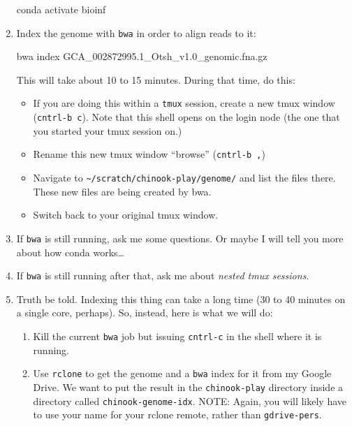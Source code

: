 \documentclass[]{krantz}
\makeatletter
\newenvironment{Shaded}{\begin{snugshade}}{\end{snugshade}}
\newcommand{\ExtensionTok}[1]{#1}
\newcommand{\NormalTok}[1]{#1}
\providecommand{\tightlist}{%
  \setlength{\itemsep}{0pt}\setlength{\parskip}{0pt}}
\newenvironment{kframe}{%
\medskip{}
\setlength{\fboxsep}{.8em}
 \def\at@end@of@kframe{}%
 \ifinner\ifhmode%
  \def\at@end@of@kframe{\end{minipage}}%
  \begin{minipage}{\columnwidth}%
 \fi\fi%
 \def\FrameCommand##1{\hskip\@totalleftmargin \hskip-\fboxsep
 \colorbox{shadecolor}{##1}\hskip-\fboxsep
     \hskip-\linewidth \hskip-\@totalleftmargin \hskip\columnwidth}%
 \MakeFramed {\advance\hsize-\width
   \@totalleftmargin\z@ \linewidth\hsize
   \@setminipage}}%
 {\par\unskip\endMakeFramed%
 \at@end@of@kframe}
\renewenvironment{Shaded}{\begin{kframe}}{\end{kframe}}
\makeatother
\begin{document}
\begin{enumerate}
\begin{Shaded}
\begin{Highlighting}[]
\ExtensionTok{conda}\NormalTok{ activate bioinf}
\end{Highlighting}
\end{Shaded}
\item
  Index the genome with \texttt{bwa} in order to align reads to it:

\begin{Shaded}
\begin{Highlighting}[]
\ExtensionTok{bwa}\NormalTok{ index GCA_002872995.1_Otsh_v1.0_genomic.fna.gz }
\end{Highlighting}
\end{Shaded}

  This will take about 10 to 15 minutes. During that time, do this:

  \begin{itemize}
  \tightlist
  \item
    If you are doing this within a \texttt{tmux} session, create a new tmux window (\texttt{cntrl-b\ c}). Note that this shell opens on the login node (the one that you started your tmux session on.)
  \item
    Rename this new tmux window ``browse'' (\texttt{cntrl-b\ ,})
  \item
    Navigate to \texttt{\textasciitilde{}/scratch/chinook-play/genome/} and list the files there. These new files
    are being created by bwa.
  \item
    Switch back to your original tmux window.
  \end{itemize}
\item
  If \texttt{bwa} is still running, ask me some questions. Or maybe I will tell you more about how conda works\ldots{}
\item
  If \texttt{bwa} is still running after that, ask me about \emph{nested tmux sessions}.
\item
  Truth be told. Indexing this thing can take a long time (30 to 40 minutes on a single core, perhaps). So,
  instead, here is what we will do:

  \begin{enumerate}
  \def\labelenumii{\alph{enumii}.}
  \tightlist
  \item
    Kill the current \texttt{bwa} job but issuing \texttt{cntrl-c} in the shell where it is running.
  \item
    Use \texttt{rclone} to get the genome and a \texttt{bwa} index for it from my Google Drive. We want to put the
    result in the \texttt{chinook-play} directory inside a directory called \texttt{chinook-genome-idx}. NOTE: Again,
    you will likely have to use your name for your rclone remote, rather than \texttt{gdrive-pers}.
  \end{enumerate}


\end{enumerate}
\end{document}
